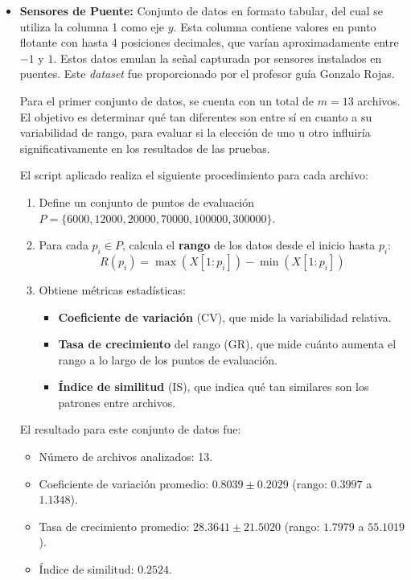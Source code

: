 \begin{itemize}
    \item \textbf{Sensores de Puente:} Conjunto de datos en formato tabular, del cual se utiliza la columna 1 como eje \(y\). Esta columna contiene valores en punto flotante con hasta 4 posiciones decimales, que varían aproximadamente entre \(-1\) y \(1\). Estos datos emulan la señal capturada por sensores instalados en puentes. Este \textit{dataset} fue proporcionado por el profesor guía Gonzalo Rojas.
    \label{input_puentes}

        Para el primer conjunto de datos, se cuenta con un total de $m = 13$ archivos. El objetivo es determinar qué tan diferentes son entre sí en cuanto a su variabilidad de rango, para evaluar si la elección de uno u otro influiría significativamente en los resultados de las pruebas.
        
        El script aplicado realiza el siguiente procedimiento para cada archivo:
        \begin{enumerate}
            \item Define un conjunto de puntos de evaluación $P = \{6000, 12000, 20000, 70000, 100000, 300000\}$.
            \item Para cada $p_i \in P$, calcula el \textbf{rango} de los datos desde el inicio hasta $p_i$:
            \[
            R(p_i) = \max(X[1:p_i]) - \min(X[1:p_i])
            \]
            \item Obtiene métricas estadísticas:
            \begin{itemize}
                \item \textbf{Coeficiente de variación} (CV), que mide la variabilidad relativa.
                \item \textbf{Tasa de crecimiento} del rango (GR), que mide cuánto aumenta el rango a lo largo de los puntos de evaluación.
                \item \textbf{Índice de similitud} (IS), que indica qué tan similares son los patrones entre archivos.
            \end{itemize}
        \end{enumerate}
        
        El resultado para este conjunto de datos fue:
        \begin{itemize}
            \item Número de archivos analizados: 13.
            \item Coeficiente de variación promedio: $0.8039 \pm 0.2029$ (rango: $0.3997$ a $1.1348$).
            \item Tasa de crecimiento promedio: $28.3641 \pm 21.5020$ (rango: $1.7979$ a $55.1019$).
            \item Índice de similitud: $0.2524$.
        \end{itemize}
        

\end{itemize}
